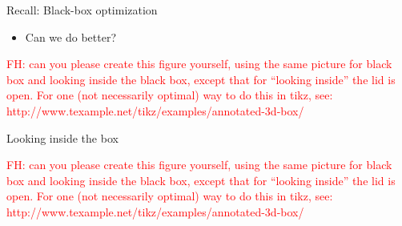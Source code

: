 \begin{frame}{Recall: Black-box optimization}
\begin{figure}
    \centering
    
\end{figure}
\fhpause
\begin{itemize}
    \item Can we do better?
\end{itemize}
    
    \textcolor{red}{FH: can you please create this figure yourself, using the same picture for black box and looking inside the black box, except that for ``looking inside'' the lid is open. For one (not necessarily optimal) way to do this in tikz, see: http://www.texample.net/tikz/examples/annotated-3d-box/}
    
\end{frame}
\begin{frame}{Looking inside the box}
\begin{figure}
    \centering
    
\end{figure}

    \textcolor{red}{FH: can you please create this figure yourself, using the same picture for black box and looking inside the black box, except that for ``looking inside'' the lid is open. For one (not necessarily optimal) way to do this in tikz, see: http://www.texample.net/tikz/examples/annotated-3d-box/}

\end{frame}


